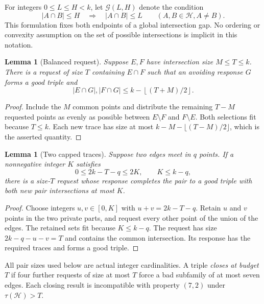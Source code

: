 \documentclass[11pt]{article}
\numberwithin{equation}{section}
\newtheorem{lemma}[theorem]{Lemma}
\theoremstyle{definition}
\theoremstyle{remark}
\newcommand{\HH}{\mathcal H}
\newcommand{\floor}[1]{\left\lfloor #1\right\rfloor}
\begin{document}
For integers $0\le L\le H<k$, let $\mathcal G(L,H)$ denote the condition
\[
 |A\cap B|\le H\quad\Longrightarrow\quad |A\cap B|\le L
 \qquad(A,B\in\HH, A\ne B).
\]
This formulation fixes both endpoints of a global intersection gap.
No ordering or convexity assumption on the set of possible intersections
is implicit in this notation.

\begin{lemma}[Balanced request]\label{lem:balanced}
Suppose $E,F$ have intersection size $M\le T\le k$. There is a request
of size $T$ containing $E\cap F$ such that an avoiding response $G$
forms a good triple and
\[
 |E\cap G|,|F\cap G|\le k-\floor{(T+M)/2}.
\]
\end{lemma}
\begin{proof}
Include the $M$ common points and distribute the remaining $T-M$
requested points as evenly as possible between $E\setminus F$ and
$F\setminus E$. Both selections fit because $T\le k$. Each new trace
has size at most $k-M-\lfloor(T-M)/2\rfloor$, which is the asserted
quantity.
\end{proof}

\begin{lemma}[Two capped traces]\label{lem:caps}
Suppose two edges meet in $q$ points. If a nonnegative integer $K$
satisfies
\[
 0\le2k-T-q\le2K,\qquad K\le k-q,
\]
there is a size-$T$ request whose response completes the pair to a
good triple with both new pair intersections at most $K$.
\end{lemma}
\begin{proof}
Choose integers $u,v\in[0,K]$ with $u+v=2k-T-q$. Retain $u$ and $v$
points in the two private parts, and request every other point of the
union of the edges. The retained sets fit because $K\le k-q$.
The request has size $2k-q-u-v=T$ and contains the common intersection.
Its response has the required traces and forms a good triple.
\end{proof}

All pair sizes used below are actual integer cardinalities.
A triple \emph{closes at budget $T$} if four further requests of size
at most $T$ force a bad subfamily of at most seven edges.
Each closing result is incompatible with property $(7,2)$ under
$\tau(\HH)>T$.
\end{document}
